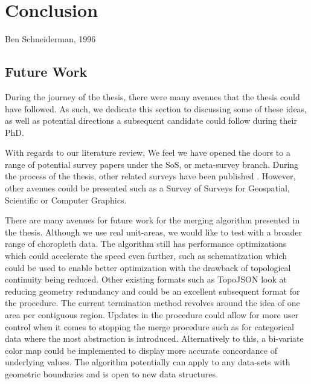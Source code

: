 \chapter{Conclusion}
\label{chap:conclusion}

{Ben Schneiderman, 1996}

\newpage
{\footnotesize \hypersetup{linkcolor=black}
\minitoc}

\section{Future Work}
During the journey of the thesis, there were many avenues that the thesis could have followed. As such, we dedicate this section to discussing some of these ideas, as well as potential directions a subsequent candidate could follow during their PhD.

With regards to our literature review, We feel we have opened the doors to a range of potential survey papers under the SoS, or meta-survey branch. During the process of the thesis, other related surveys have been published \cite{alharbi2017molecular, alharbi2018sos, rees2019survey}. However, other avenues could be presented such as a Survey of Surveys for Geospatial, Scientific or Computer Graphics.

There are many avenues for future work for the merging algorithm presented in the thesis. Although we use real unit-areas, we would like to test with a broader range of choropleth data. The algorithm still has performance optimizations which could accelerate the speed even further, such as schematization \cite{barkowsky2000schematizing} which could be used to enable better optimization with the drawback of topological continuity being reduced. Other existing formats such as TopoJSON \cite{bostock2018topojson} look at reducing geometry redundancy and could be an excellent subsequent format for the procedure. The current termination method revolves around the idea of one area per contiguous region. Updates in the procedure could allow for more user control when it comes to stopping the merge procedure such as for categorical data where the most abstraction is introduced. Alternatively to this, a bi-variate color map could be implemented to display more accurate concordance of underlying values.  The algorithm potentially can apply to any data-sets with geometric boundaries and is open to new data structures. 

